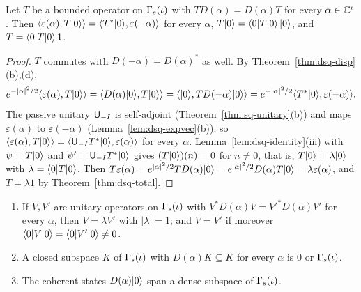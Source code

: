 \begin{veteenv}
\begin{theorem}[Irreducibility]\label{thm:dsq-irreducible}
Let $T$ be a bounded operator on $\Gamma_s(\iota)$ with $TD(\alpha)=D(\alpha)T$ for every $\alpha\in\mathbb C^\iota$. Then
$\langle\varepsilon(\alpha),T\lvert 0\rangle\rangle=\langle T^*\lvert 0\rangle,\varepsilon(-\alpha)\rangle$ for every $\alpha$,
$T\lvert 0\rangle=\langle0\rvert T\lvert 0\rangle\,\lvert 0\rangle$, and $T=\langle0\rvert T\lvert 0\rangle\,1$.
\end{theorem}

\begin{proof}
$T$ commutes with $D(-\alpha)=D(\alpha)^*$ as well. By Theorem~\ref{thm:dsq-disp}(b),(d),
\[
 e^{-\lvert\alpha\rvert^2/2}\langle\varepsilon(\alpha),T\lvert 0\rangle\rangle=\langle D(\alpha)\lvert 0\rangle,T\lvert 0\rangle\rangle=\langle\lvert 0\rangle,TD(-\alpha)\lvert 0\rangle\rangle
 =e^{-\lvert\alpha\rvert^2/2}\langle T^*\lvert 0\rangle,\varepsilon(-\alpha)\rangle .
\]
The passive unitary $\mathsf U_{-I}$ is self-adjoint (Theorem~\ref{thm:sq-unitary}(b)) and maps $\varepsilon(\alpha)$ to
$\varepsilon(-\alpha)$ (Lemma~\ref{lem:dsq-expvec}(b)), so $\langle\varepsilon(\alpha),T\lvert 0\rangle\rangle=\langle\mathsf U_{-I}T^*\lvert 0\rangle,
\varepsilon(\alpha)\rangle$ for every $\alpha$. Lemma~\ref{lem:dsq-identity}(iii) with $\psi=T\lvert 0\rangle$ and $\psi'=\mathsf U_{-I}T^*\lvert 0\rangle$
gives $(T\lvert 0\rangle)(n)=0$ for $n\ne0$, that is, $T\lvert 0\rangle=\lambda\lvert 0\rangle$ with $\lambda=\langle0\rvert T\lvert 0\rangle$. Then
$T\varepsilon(\alpha)=e^{\lvert\alpha\rvert^2/2}TD(\alpha)\lvert 0\rangle=e^{\lvert\alpha\rvert^2/2}D(\alpha)T\lvert 0\rangle=\lambda\varepsilon(\alpha)$, and
$T=\lambda1$ by Theorem~\ref{thm:dsq-total}.
\end{proof}

\begin{corollary}\label{cor:dsq-irreducible}
\begin{enumerate}
\item[(a)] If $V,V'$ are unitary operators on $\Gamma_s(\iota)$ with $V^*D(\alpha)V=V'^*D(\alpha)V'$ for every $\alpha$, then $V=\lambda V'$
with $\lvert\lambda\rvert=1$; and $V=V'$ if moreover $\langle0\rvert V\lvert 0\rangle=\langle0\rvert V'\lvert 0\rangle\ne0$.
\item[(b)] A closed subspace $K$ of $\Gamma_s(\iota)$ with $D(\alpha)K\subseteq K$ for every $\alpha$ is $0$ or $\Gamma_s(\iota)$.
\item[(c)] The coherent states $D(\alpha)\lvert 0\rangle$ span a dense subspace of $\Gamma_s(\iota)$.
\end{enumerate}
\end{corollary}


\end{veteenv}
